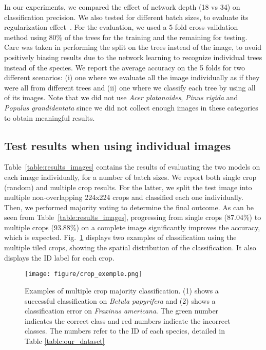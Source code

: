 \documentclass[letterpaper, 10 pt, conference]{ieeeconf}  %
\begin{document}
In our experiments, we compared the effect of network depth (18 vs 34) on classification precision. We also tested for different batch sizes, to evaluate its regularization effect~\cite{FlatMiniBatch2018}. For the evaluation, we used a 5-fold cross-validation method using 80\% of the trees for the training and the remaining for testing. Care was taken in performing the split on the trees instead of the image, to avoid positively biasing results due to the network learning to recognize individual trees instead of the species.
We report the average accuracy on the 5 folds for two different scenarios: (i) one where we evaluate all the image individually as if they were all from different trees and (ii) one where we classify each tree by using all of its images.
Note that we did not use \emph{Acer platanoides}, \emph{Pinus rigida} and \emph{Populus grandidentata} since we did not collect enough images in these categories to obtain meaningful results.

\subsection{Test results when using individual images}
\label{SinglePictureTest}
Table~\ref{table:results_images} contains the results of evaluating the two models on each image individually, for a number of batch sizes. We report both single crop (random) and multiple crop results. For the latter, we split the test image into multiple non-overlapping 224x224 crops and classified each one individually. Then, we performed majority voting to determine the final outcome. As can be seen from Table~\ref{table:results_images}, progressing from single crops (87.04\%) to multiple crops (93.88\%) on a complete image significantly improves the accuracy, which is expected. Fig.~\ref{fig:crop_exemple} displays two examples of classification using the multiple tiled crops, showing the spatial distribution of the classification. It also displays the ID label for each crop.

\begin{figure}[t]
\vspace*{3mm}
\centering
\texttt{[image: figure/crop\_exemple.png]}
\caption{Examples of multiple crop majority classification. (1) shows a successful classification on \emph{Betula papyrifera} and (2) shows a classification error on \emph{Fraxinus americana}. The green number indicates the correct class and red numbers indicate the incorrect classes. The numbers refer to the ID of each species, detailed in Table \ref{table:our_dataset}}
\label{fig:crop_exemple}
\end{figure}
\end{document}
